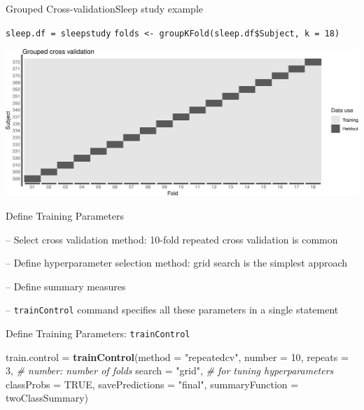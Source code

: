 \documentclass[ignorenonframetext,]{beamer}
\newenvironment{Shaded}{\begin{snugshade}}{\end{snugshade}}
\newcommand{\KeywordTok}[1]{\textcolor[rgb]{0.13,0.29,0.53}{\textbf{#1}}}
\newcommand{\DataTypeTok}[1]{\textcolor[rgb]{0.13,0.29,0.53}{#1}}
\newcommand{\DecValTok}[1]{\textcolor[rgb]{0.00,0.00,0.81}{#1}}
\newcommand{\StringTok}[1]{\textcolor[rgb]{0.31,0.60,0.02}{#1}}
\newcommand{\CommentTok}[1]{\textcolor[rgb]{0.56,0.35,0.01}{\textit{#1}}}
\newcommand{\OtherTok}[1]{\textcolor[rgb]{0.56,0.35,0.01}{#1}}
\newcommand{\NormalTok}[1]{#1}
\begin{document}
\begin{frame}[fragile]{Grouped Cross-validation\textbar{}Sleep study
example}

\texttt{sleep.df\ =\ sleepstudy}
\texttt{folds\ \textless{}-\ groupKFold(sleep.df\$Subject,\ k\ =\ 18)}

\includegraphics{ML_with_caret_files/figure-beamer/groupfold-1.pdf}

\end{frame}

\begin{frame}[fragile]{Define Training Parameters}

-- Select cross validation method: 10-fold repeated cross validation is
common

-- Define hyperparameter selection method: grid search is the simplest
approach

-- Define summary measures

-- \texttt{trainControl} command specifies all these parameters in a
single statement

\end{frame}

\begin{frame}[fragile]{Define Training Parameters:
\texttt{trainControl}}

\begin{Shaded}
\begin{Highlighting}[]
\NormalTok{train.control =}\StringTok{ }\KeywordTok{trainControl}\NormalTok{(}\DataTypeTok{method =} \StringTok{"repeatedcv"}\NormalTok{, }
                              \DataTypeTok{number =} \DecValTok{10}\NormalTok{, }\DataTypeTok{repeats =} \DecValTok{3}\NormalTok{, }\CommentTok{# number: number of folds}
                              \DataTypeTok{search =} \StringTok{"grid"}\NormalTok{, }\CommentTok{# for tuning hyperparameters}
                              \DataTypeTok{classProbs =} \OtherTok{TRUE}\NormalTok{,}
                              \DataTypeTok{savePredictions =} \StringTok{"final"}\NormalTok{,}
                              \DataTypeTok{summaryFunction =}\NormalTok{ twoClassSummary)}
\end{Highlighting}
\end{Shaded}

\end{frame}
\end{document}
